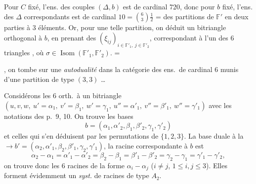 \documentclass[11pt,a4paper]{article}
\begin{document}
Pour $C$ fixé, l'ens. des couples $(\Delta, b)$ est de cardinal
 720, donc pour $b$  fixé, l'ens.
des $\Delta$ correspondants est de cardinal
$10 = \binom{6}{3} \frac{1}{2}$ =  des partitions
 de $\mathbb{F}'$ en
deux parties à 3 éléments. Or, pour une telle partition, on déduit un
bitriangle orthogonal à $b$, en prenant  des
$(\xi_{ij})_{i \in \mathbb{F}'_1,\ j \in \mathbb{F}'_2}$, correspondant à
l'un  des 6 triangles
, où
$\sigma \in \operatorname{Isom}(\mathbb{F}'_1, \mathbb{F}'_2)$.
 \ill{} =

, on tombe sur une \emph{autodualité} dans la
catégorie des ens.\ de cardinal 6 munis d'une partition de type
$(3, 3)$ \ldots
{}


Considérons les 6   orth.\ à un bitriangle
$(u, v, w,\ u' = \alpha_1,\ v' = \beta_1,\ w' = \gamma_1,\ u'' = \alpha'_1,\ v'' = \beta'_1,\ w'' = \gamma'_1)$
\struck{\ill{}} avec les notations des p.~9, 10. On trouve les bases
\struck{\ill{}}
\[
b = (\alpha_1, \alpha'_2, \beta_1, \beta'_2, \gamma_1, \gamma'_2)
\]
et celles qui s'en déduisent par les  permutations de
$\lbrace 1, 2, 3 \rbrace$. La base duale à la 
$\to b' = (\alpha_2, \alpha'_1, \beta_2, \beta'_1, \gamma_2, \gamma'_1)$,
la racine correspondante à $b$ est
\[
\alpha_2 - \alpha_1 = \alpha'_1 - \alpha'_2 = \beta_2 - \beta_1 = \beta'_1 - \beta'_2 = \gamma_2 - \gamma_1 = \gamma'_1 - \gamma'_2 ,
\]
on trouve donc les 6 racines de la forme $\alpha_i - \alpha_j$
($i \neq j$, $1 \leq i, j \leq 3$). Elles forment évidemment un
\emph{syst.} de racines de type $A_2$.
\end{document}
